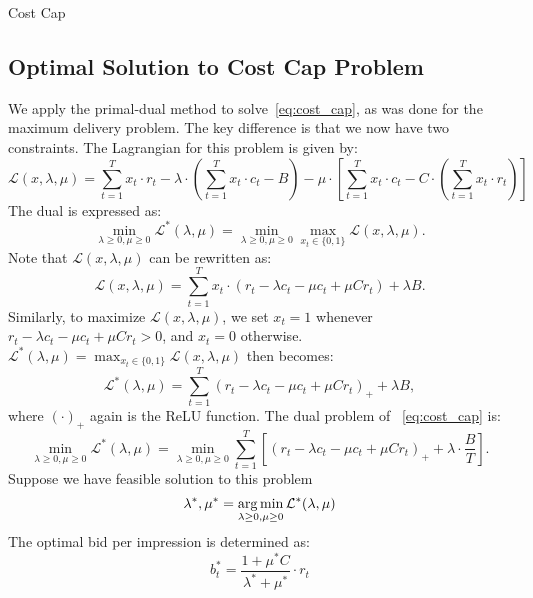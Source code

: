 \documentclass[../main.tex]{subfiles}
\begin{document}
\begin{section}{Cost Cap}
	\subsection* {Optimal Solution to Cost Cap Problem}
	We apply the primal-dual method to solve~\eqref{eq:cost_cap}, as was done for the maximum delivery problem. The key difference is that we now have two constraints. The Lagrangian for this problem is given by:
	\begin{equation*} 
		\mathcal{L}(x, \lambda, \mu) = \sum_{t=1}^T x_t \cdot r_t  - \lambda \cdot \left( \sum_{t=1}^{T} x_t \cdot c_t  - B  \right) - \mu \cdot \left[ \sum_{t=1}^{T} x_t \cdot c_t - C \cdot \left(\sum_{t=1}^{T} x_t \cdot r_t \right) \right] 
	\end{equation*}
	The dual  is expressed as:
	\begin{equation*}
		\min_{\lambda \geq 0, \mu \geq 0} \mathcal{L}^*(\lambda, \mu) = \min_{\lambda \geq 0, \mu \geq 0} \max_{x_t \in \{0,1\}} \mathcal{L}(x, \lambda, \mu).
	\end{equation*}
	Note that \(\mathcal{L}(x, \lambda, \mu)\) can be rewritten as:
	\begin{equation*}
		\mathcal{L}(x, \lambda, \mu) = \sum_{t=1}^T  x_t \cdot (r_t - \lambda c_t - \mu c_t + \mu C r_t)  + \lambda B.
	\end{equation*}
	Similarly, to maximize \(\mathcal{L}(x, \lambda, \mu)\), we set \(x_t = 1\) whenever \(r_t - \lambda c_t - \mu c_t + \mu C r_t  > 0\), and \(x_t = 0\) otherwise. \(\mathcal{L}^*(\lambda, \mu) = \max_{x_t \in \{0,1\}} \mathcal{L}(x, \lambda, \mu)\) then becomes:
	\begin{equation*}
		\mathcal{L}^*(\lambda, \mu) = \sum_{t=1}^{T} (r_t - \lambda c_t - \mu c_t + \mu C r_t)_{+}  + \lambda B,
	\end{equation*}
	where $(\cdot)_{+}$ again is the ReLU function.  The dual problem of ~\eqref{eq:cost_cap} is:
	\begin{equation}
		\min_{\lambda \geq 0, \mu \geq 0}  \mathcal{L}^*(\lambda, \mu) = \min_{\lambda \geq 0, \mu \geq 0}  \sum_{t=1}^{T} \left[ (r_t - \lambda c_t - \mu c_t + \mu C r_t)_{+} + \lambda \cdot \frac{B}{T} \right].
	\end{equation}
	Suppose we have feasible solution to this problem 
	\[
	\lambda^*, \mu^* = \operatorname*{arg\,min}_{\lambda \geq 0, \mu \geq 0} \mathcal{L}^*(\lambda, \mu)
	\]
	The optimal bid per impression is determined as: 
	\begin{equation*}
		b_t^* = \frac{1 + \mu^* C }{ \lambda^* + \mu^*} \cdot r_t
	\end{equation*}

\end{section}
\end{document}
